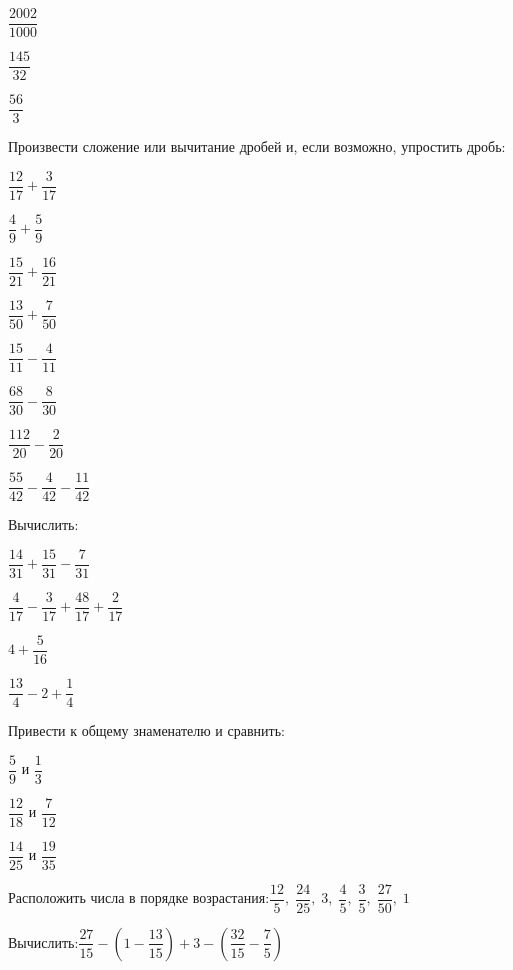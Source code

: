 \begin{listofex}
\begin{enumcols}[itemcolumns=6]
		\item \( \dfrac{2002}{1000} \)
		\item \( \dfrac{145}{32} \)
		\item \( \dfrac{56}{3} \)
	\end{enumcols}
	\item Произвести сложение или вычитание дробей и, если возможно, упростить дробь:
	\begin{enumcols}[itemcolumns=4]
		\item \( \dfrac{12}{17}+\dfrac{3}{17} \)
		\item \( \dfrac{4}{9}+\dfrac{5}{9} \)
		\item \( \dfrac{15}{21}+\dfrac{16}{21} \)
		\item \( \dfrac{13}{50}+\dfrac{7}{50} \)
		\item \( \dfrac{15}{11}-\dfrac{4}{11} \)
		\item \( \dfrac{68}{30}-\dfrac{8}{30} \)
		\item \( \dfrac{112}{20}-\dfrac{2}{20} \)
		\item \( \dfrac{55}{42}-\dfrac{4}{42}-\dfrac{11}{42} \)
	\end{enumcols}
	\item Вычислить:
	\begin{enumcols}[itemcolumns=4]
		\item \( \dfrac{14}{31}+\dfrac{15}{31}-\dfrac{7}{31} \)
		\item \( \dfrac{4}{17}-\dfrac{3}{17}+\dfrac{48}{17}+\dfrac{2}{17} \)
		\item \( 4+\dfrac{5}{16} \)
		\item \( \dfrac{13}{4}-2+\dfrac{1}{4} \)
	\end{enumcols}
	\item Привести к общему знаменателю и сравнить:
	\begin{enumcols}[itemcolumns=3]
		\item \( \dfrac{5}{9} \) и \( \dfrac{1}{3} \)
		\item \( \dfrac{12}{18} \) и \( \dfrac{7}{12} \)
		\item \( \dfrac{14}{25} \) и \( \dfrac{19}{35} \)
	\end{enumcols}
	\item Расположить числа в порядке возрастания:\quad\( \dfrac{12}{5},\;\dfrac{24}{25},\;3,\;\dfrac{4}{5},\;\dfrac{3}{5},\;\dfrac{27}{50},\;1 \)
	\item Вычислить:\quad\( \dfrac{27}{15}-\left( 1-\dfrac{13}{15} \right)+3-\left( \dfrac{32}{15}-\dfrac{7}{5} \right) \)
\end{listofex}
